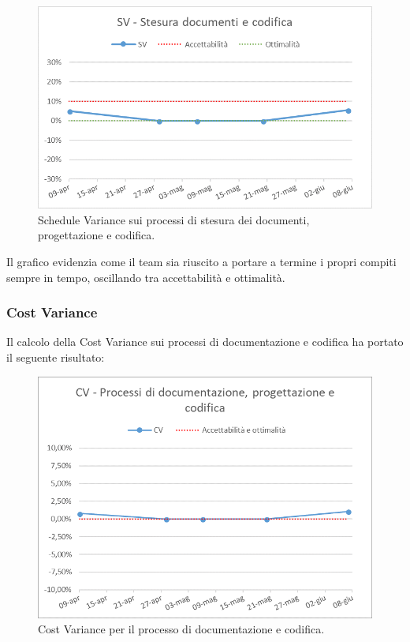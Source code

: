 \begin{figure}[h!]
	\centering
	\includegraphics[scale=0.75]{img/Grafici/SV.png}
	\caption{Schedule Variance sui processi di stesura dei documenti, progettazione e codifica.}
	\label{fig:SV-Documenti}
\end{figure}

Il grafico evidenzia come il team sia riuscito a portare a termine i propri compiti sempre in tempo, oscillando tra accettabilità e ottimalità.

\subsubsection{Cost Variance}
Il calcolo della Cost Variance sui processi di documentazione e codifica ha portato il seguente risultato: 

\begin{figure}[h!]
	\centering
	\includegraphics[scale=0.75]{img/Grafici/CV-cod_e_doc.png}
	\caption{Cost Variance per il processo di documentazione e codifica.}
	\label{fig:CV-Documenti}
\end{figure}


